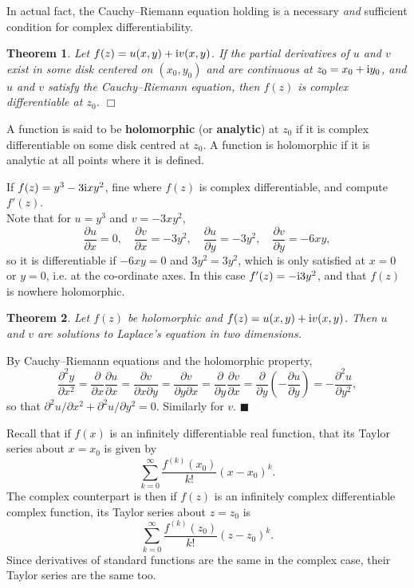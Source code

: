 \documentclass[letter-paper]{tufte-book}
\newtheorem{theorem}{\color{pastel-blue}Theorem}[section]
\newenvironment{proof}[1][Proof]{\begin{trivlist}
\item[\hskip \labelsep {\bfseries #1}]}{\end{trivlist}}
\newenvironment{example}[1][Example]{\begin{trivlist}
\item[\hskip \labelsep {\bfseries #1}]}{\end{trivlist}}
\newcommand{\dy}{\partial}
\newcommand{\ddy}[2]{\frac{\dy#1}{\dy#2}}
\newcommand{\zi}{{\rm i}}
\newcommand\Def[1]{\textbf{#1}}
\newcommand{\qed}{\hfill$\blacksquare$}
\newcommand{\qedwhite}{\hfill \ensuremath{\Box}}
\begin{document}
In actual fact, the Cauchy--Riemann equation holding is a necessary \emph{and}
sufficient condition for complex differentiability.

\begin{theorem}
  Let $f(z) = u(x,y) + \zi v(x,y)$. If the partial derivatives of $u$ and $v$
  exist in some disk centered on $(x_0, y_0)$ and are continuous at $z_0 = x_0 +
  \zi y_0$, and $u$ and $v$ satisfy the Cauchy--Riemann equation, then $f(z)$ is
  complex differentiable at $z_0$. \qedwhite
\end{theorem}

A function is said to be \Def{holomorphic} (or \Def{analytic}) at $z_0$ if it is
complex differentiable on some disk centred at $z_0$. A function is holomorphic
if it is analytic at all points where it is defined.

\begin{example}
  If $f(z) = y^3 - 3\zi x y^2$, fine where $f(z)$ is complex differentiable, and
  compute $f'(z)$.\\
  
  Note that for $u = y^3$ and $v = -3xy^2$,
  \begin{equation*}
    \ddy{u}{x} = 0, \quad \ddy{v}{x} = -3y^2, \quad \ddy{u}{y} = -3y^2, \quad \ddy{v}{y} = -6xy,
  \end{equation*}
  so it is differentiable if $-6xy = 0$ and $3y^2 = 3y^2$, which is only
  satisfied at $x=0$ or $y=0$, i.e. at the co-ordinate axes. In this case $f'(z)
  = -\zi 3y^2$, and that $f(z)$ is nowhere holomorphic.
\end{example}

\begin{theorem}
  Let $f(z)$ be holomorphic and $f(z) = u(x,y) + \zi v(x,y)$. Then $u$ and $v$
  are solutions to Laplace's equation in two dimensions.
\end{theorem}
\begin{proof}
  By Cauchy--Riemann equations and the holomorphic property,
  \begin{equation*}
    \ddy{^2 y}{x^2} = \ddy{}{x}\ddy{u}{x} = \ddy{v}{x\partial y} = \ddy{v}{y\partial x} = \ddy{}{y}\ddy{v}{x} = \ddy{}{y}\left(-\ddy{u}{y}\right) = -\ddy{^2 u}{y^2},
  \end{equation*}
  so that $\partial^2 u / \partial x^2 + \partial^2 u / \partial y^2 = 0$.
  Similarly for $v$. \qed
\end{proof}

Recall that if $f(x)$ is an infinitely differentiable real function, that its
Taylor series about $x = x_0$ is given by
\begin{equation*}
  \sum^\infty_{k=0} \frac{f^{(k)}(x_0)}{k!}(x - x_0)^k.
\end{equation*}
The complex counterpart is then if $f(z)$ is an infinitely complex
differentiable complex function, its Taylor series about $z = z_0$ is
\begin{equation*}
  \sum^\infty_{k=0} \frac{f^{(k)}(z_0)}{k!}(z - z_0)^k.
\end{equation*}
Since derivatives of standard functions are the same in the complex case, their
Taylor series are the same too.
\end{document}
